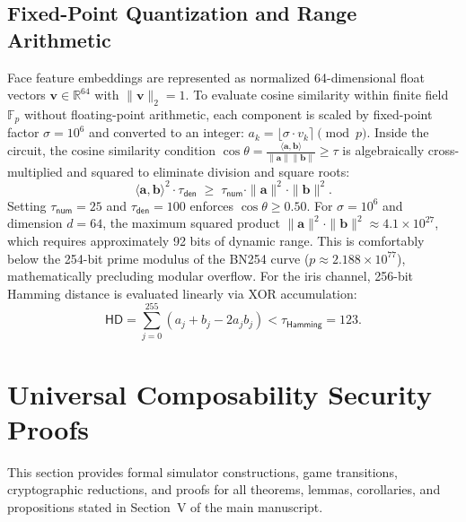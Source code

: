 \documentclass[10pt,letterpaper,journal]{IEEEtran}
\begin{document}
\subsection{Fixed-Point Quantization and Range Arithmetic}
Face feature embeddings are represented as normalized 64-dimensional float vectors $\mathbf{v} \in \mathbb{R}^{64}$ with $\|\mathbf{v}\|_2 = 1$. To evaluate cosine similarity within finite field $\mathbb{F}_p$ without floating-point arithmetic, each component is scaled by fixed-point factor $\sigma = 10^6$ and converted to an integer: $a_k = \lfloor \sigma \cdot v_k \rceil \pmod{p}$.
Inside the circuit, the cosine similarity condition $\cos\theta = \frac{\langle \mathbf{a}, \mathbf{b} \rangle}{\|\mathbf{a}\| \|\mathbf{b}\|} \geq \tau$ is algebraically cross-multiplied and squared to eliminate division and square roots:
\begin{equation}
  \langle \mathbf{a}, \mathbf{b} \rangle^2 \cdot \tau_{\mathsf{den}} \;\geq\; \tau_{\mathsf{num}} \cdot \|\mathbf{a}\|^2 \cdot \|\mathbf{b}\|^2. \label{eq:cosine-constraint}
\end{equation}
Setting $\tau_{\mathsf{num}} = 25$ and $\tau_{\mathsf{den}} = 100$ enforces $\cos\theta \geq 0.50$. For $\sigma = 10^6$ and dimension $d=64$, the maximum squared product $\|\mathbf{a}\|^2 \cdot \|\mathbf{b}\|^2 \approx 4.1 \times 10^{27}$, which requires approximately 92 bits of dynamic range. This is comfortably below the 254-bit prime modulus of the BN254 curve ($p \approx 2.188 \times 10^{77}$), mathematically precluding modular overflow.
For the iris channel, 256-bit Hamming distance is evaluated linearly via XOR accumulation:
\begin{equation}
  \mathsf{HD} = \sum_{j=0}^{255}(a_j + b_j - 2a_jb_j) < \tau_{\mathsf{Hamming}} = 123. \label{eq:hd}
\end{equation}

\section{Universal Composability Security Proofs}
\label{sec:supp-security-proofs}

This section provides formal simulator constructions, game transitions, cryptographic reductions, and proofs for all theorems, lemmas, corollaries, and propositions stated in Section~V of the main manuscript.
\end{document}
